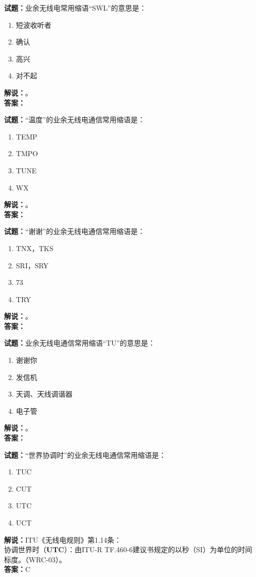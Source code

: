\documentclass{ctexbook}
\begin{document}
\bigskip

\noindent\textbf{试题：}业余无线电常用缩语“SWL”的意思是：
\begin{enumerate}[leftmargin=3em]
  \item 短波收听者
  \item 确认
  \item 高兴
  \item 对不起
\end{enumerate}
\noindent\textbf{解说：}\textbf{}。\\\noindent\textbf{答案：}

\bigskip

\noindent\textbf{试题：}“温度”的业余无线电通信常用缩语是：
\begin{enumerate}[leftmargin=3em]
  \item TEMP
  \item TMPO
  \item TUNE
  \item WX
\end{enumerate}
\noindent\textbf{解说：}\textbf{}。\\\noindent\textbf{答案：}

\bigskip

\noindent\textbf{试题：}“谢谢”的业余无线电通信常用缩语是：
\begin{enumerate}[leftmargin=3em]
  \item TNX，TKS
  \item SRI，SRY
  \item 73
  \item TRY
\end{enumerate}
\noindent\textbf{解说：}\textbf{}。\\\noindent\textbf{答案：}

\bigskip

\noindent\textbf{试题：}业余无线电通信常用缩语“TU”的意思是：
\begin{enumerate}[leftmargin=3em]
  \item 谢谢你
  \item 发信机
  \item 天调、天线调谐器
  \item 电子管
\end{enumerate}
\noindent\textbf{解说：}\textbf{}。\\\noindent\textbf{答案：}

\bigskip

\noindent\textbf{试题：}“世界协调时”的业余无线电通信常用缩语是：
\begin{enumerate}[leftmargin=3em]
  \item TUC
  \item CUT
  \item UTC
  \item UCT
\end{enumerate}
\noindent\textbf{解说：}ITU《无线电规则》第1.14条：\\协调世界时（\textbf{UTC}）：由ITU-R TF.460-6建议书规定的以秒（SI）为单位的时间标度。（WRC-03）。\\\noindent\textbf{答案：}C
\end{document}
